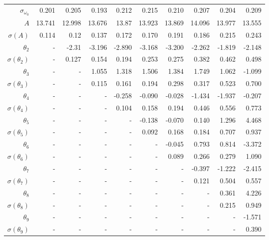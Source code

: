 \documentclass{matmex-diploma-custom}
\begin{document}
\begin{table}[h!]
\begin{tabular}{r|rrrrrrrrr}
 $\sigma_{\omega_0} $& 0.201       &    0.205 &    0.193 &    0.212 &   0.215 &     0.210 &    0.207 &    0.204 &    0.209 \\
 $A $&13.741      &   12.998 &   13.676 &    13.87 &  13.923 &   13.869 &   14.096 &   13.977 &   13.555 \\
 $\sigma(A) $ & 0.114       &     0.12 &    0.137 &    0.172 &    0.170 &    0.191 &    0.186 &    0.215 &    0.243 \\
 $\theta_2$&-        &  -2.31 &   -3.196 &    -2.890 &  -3.168 &     -3.200 &   -2.262 &   -1.819 &   -2.148 \\
 $\sigma(\theta_2)$&-      &    0.127 &    0.154 &    0.194 &   0.253 &    0.275 &    0.382 &    0.462 &    0.498 \\
 $\theta_3$&-      &    - &   1.055 &    1.318 &   1.506 &    1.384 &    1.749 &    1.062 &   -1.099 \\
 $\sigma(\theta_3)$&-      &    - &   0.115 &    0.161 &   0.194 &    0.298 &    0.317 &    0.523 &    0.700 \\
 $\theta_4$&-      &    - &    - &  -0.258 &  -0.090 &   -0.028 &   -1.434 &   -1.937 &   -0.207 \\
 $\sigma(\theta_4)$&-      &    - &    - &     0.104 &   0.158 &    0.194 &    0.446 &    0.556 &    0.773 \\
 $\theta_5$&-      &    - &    - &    - &   -0.138 &   -0.070 &    0.140 &    1.296 &    4.468 \\
 $\sigma(\theta_5)$&-      &    - &    - &    - &    0.092 &    0.168 &    0.184 &    0.707 &    0.937 \\
 $\theta_6$&-      &    - &    - &    - &    - &    -0.045 &    0.793 &    0.814 &   -3.372 \\
 $\sigma(\theta_6)$&-    &    - &    - &    - &    - &    0.089 &    0.266 &    0.279 &    1.090 \\
 $\theta_7$&-     &    - &    - &    - &    - &    - &  -0.397 &   -1.222 &   -2.415 \\
 $ \sigma(\theta_7)$&-     &    - &    - &    - &    - &    - &      0.121 &    0.504 &    0.557 \\
 $\theta_8$&-     &    - &    - &    - &    - &    - &    - &   0.361 &    4.226 \\
 $ \sigma(\theta_8)$&-     &    - &    - &    - &    - &    - &    - &    0.215 &    0.949 \\
 $\theta_9$&-     &    - &    - &    - &    - &    - &    - &    - &  -1.571  \\
 $ \sigma(\theta_9)$&-     &    - &    - &    - &    - &    - &    - &    - &   0.390  \\
\end{tabular}
\end{table}
\end{document}
